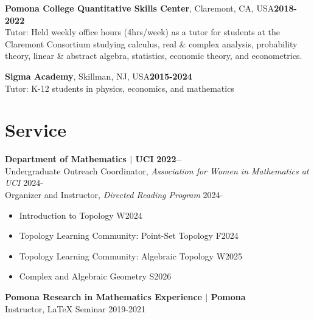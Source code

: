 \documentclass[margin,line]{res}
\begin{document}
\begin{resume}
{\bf Pomona College Quantitative Skills Center}, Claremont, CA, USA\hfill {\bf2018-2022}\\
Tutor: {\color{gray} Held weekly office hours (4hrs/week) as a tutor for students at the Claremont Consortium studying calculus, real \& complex analysis, probability theory, linear \& abstract algebra, statistics, economic theory, and econometrics.}

{\bf Sigma Academy}, Skillman, NJ, USA\hfill {\bf2015-2024}\\
Tutor: {\color{gray} K-12 students in physics, economics, and mathematics}
 
\section{\sc Service}
{\bf Department of Mathematics $\mid$ UCI }\hfill {\bf2022--}\\
Undergraduate Outreach Coordinator, \emph{Association for Women in Mathematics at UCI} \hfill 2024- \\
Organizer and Instructor, \emph{Directed Reading Program} \hfill 2024-
\begin{itemize}
  \renewcommand\labelitemi{--}
  \item Introduction to Topology \hfill {W2024}
  \item Topology Learning Community: Point-Set Topology \hfill {F2024}
  \item Topology Learning Community: Algebraic Topology \hfill {W2025}
  \item Complex and Algebraic Geometry \hfill {S2026}
\end{itemize}

{\bf Pomona Research in Mathematics Experience $\mid$ Pomona} \hfill \\%
Instructor, \LaTeX{} Seminar  \hfill 2019-2021




\end{resume}
\end{document}
